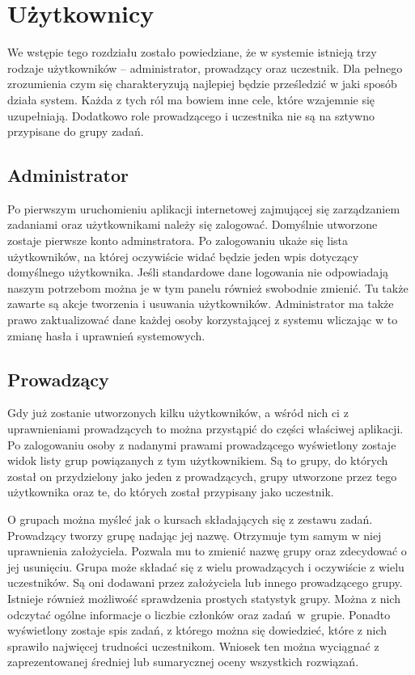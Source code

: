 \documentclass[wimgr]{xmgr}
\begin{document}
\section{Użytkownicy}

We wstępie tego rozdziału zostało powiedziane, że w systemie istnieją trzy rodzaje użytkowników -- administrator, prowadzący oraz uczestnik. Dla pełnego zrozumienia czym się charakteryzują najlepiej będzie prześledzić w jaki sposób działa system. Każda z tych ról ma bowiem inne cele, które wzajemnie się uzupełniają. Dodatkowo role prowadzącego i uczestnika nie są na sztywno przypisane do grupy zadań. 

\subsection{Administrator}

Po pierwszym uruchomieniu aplikacji internetowej zajmującej się zarządzaniem zadaniami oraz użytkownikami należy się zalogować. Domyślnie utworzone zostaje pierwsze konto adminstratora. Po zalogowaniu ukaże się lista użytkowników, na której oczywiście widać będzie jeden wpis dotyczący domyślnego użytkownika. Jeśli standardowe dane logowania nie odpowiadają naszym potrzebom można je w tym panelu również swobodnie zmienić. Tu także zawarte są akcje tworzenia i usuwania użytkowników. Administrator ma także prawo zaktualizować dane każdej osoby korzystającej z systemu wliczając w to zmianę hasła i uprawnień systemowych.

\subsection{Prowadzący}

Gdy już zostanie utworzonych kilku użytkowników, a wśród nich ci z uprawnieniami prowadzących to można przystąpić do części właściwej aplikacji. Po zalogowaniu osoby z nadanymi prawami prowadzącego wyświetlony zostaje widok listy grup powiązanych z tym użytkownikiem. Są to grupy, do których został on przydzielony jako jeden z prowadzących, grupy utworzone przez tego użytkownika oraz te, do których został przypisany jako uczestnik. 

O grupach można myśleć jak o kursach składających się z zestawu zadań. Prowadzący tworzy grupę nadając jej nazwę. Otrzymuje tym samym w niej uprawnienia założyciela. Pozwala mu to zmienić nazwę grupy oraz zdecydować o jej usunięciu. Grupa może składać się z wielu prowadzących i oczywiście z wielu uczestników. Są oni dodawani przez założyciela lub innego prowadzącego grupy. Istnieje również możliwość sprawdzenia prostych statystyk grupy. Można z nich odczytać ogólne informacje o liczbie członków oraz zadań~w~grupie. Ponadto wyświetlony zostaje spis zadań, z którego można się dowiedzieć, które z nich sprawiło najwięcej trudności uczestnikom. Wniosek ten można wyciągnać z zaprezentowanej średniej lub sumarycznej oceny wszystkich rozwiązań.
\end{document}
